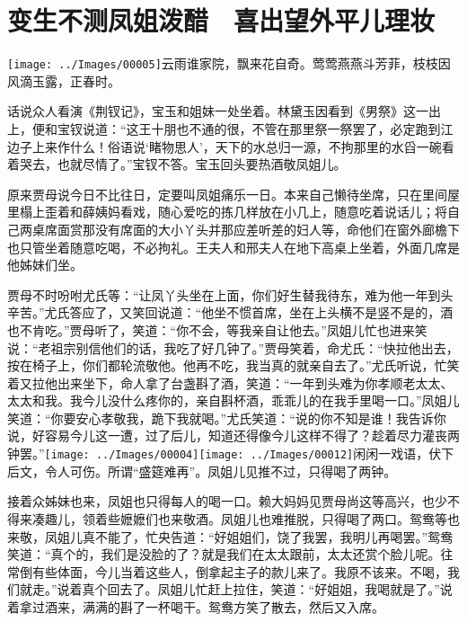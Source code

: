 

\chapter{变生不测凤姐泼醋　喜出望外平儿理妆}\label{part0048_split_000.htmlux5cux23calibre_pb_0}

{\texttt{[image: ../Images/00005]}云雨谁家院，飘来花自奇。莺莺燕燕斗芳菲，枝枝因风滴玉露，正春时。}

话说众人看演《荆钗记》，宝玉和姐妹一处坐着。林黛玉因看到《男祭》这一出上，便和宝钗说道：``这王十朋也不通的很，不管在那里祭一祭罢了，必定跑到江边子上来作什么！俗语说`睹物思人'，天下的水总归一源，不拘那里的水舀一碗看着哭去，也就尽情了。''宝钗不答。宝玉回头要热酒敬凤姐儿。

原来贾母说今日不比往日，定要叫凤姐痛乐一日。本来自己懒待坐席，只在里间屋里榻上歪着和薛姨妈看戏，随心爱吃的拣几样放在小几上，随意吃着说话儿；将自己两桌席面赏那没有席面的大小丫头并那应差听差的妇人等，命他们在窗外廊檐下也只管坐着随意吃喝，不必拘礼。王夫人和邢夫人在地下高桌上坐着，外面几席是他姊妹们坐。

贾母不时吩咐尤氏等：``让凤丫头坐在上面，你们好生替我待东，难为他一年到头辛苦。''尤氏答应了，又笑回说道：``他坐不惯首席，坐在上头横不是竖不是的，酒也不肯吃。''贾母听了，笑道：``你不会，等我亲自让他去。''凤姐儿忙也进来笑说：``老祖宗别信他们的话，我吃了好几钟了。''贾母笑着，命尤氏：``快拉他出去，按在椅子上，你们都轮流敬他。他再不吃，我当真的就亲自去了。''尤氏听说，忙笑着又拉他出来坐下，命人拿了台盏斟了酒，笑道：``一年到头难为你孝顺老太太、太太和我。我今儿没什么疼你的，亲自斟杯酒，乖乖儿的在我手里喝一口。''凤姐儿笑道：``你要安心孝敬我，跪下我就喝。''尤氏笑道：``说的你不知是谁！我告诉你说，好容易今儿这一遭，过了后儿，知道还得像今儿这样不得了？趁着尽力灌丧两钟罢。''{\texttt{[image: ../Images/00004]}\texttt{[image: ../Images/00012]}\footnotesize \kaishu 闲闲一戏语，伏下后文，令人可伤。所谓``盛筵难再''。}凤姐儿见推不过，只得喝了两钟。

接着众姊妹也来，凤姐也只得每人的喝一口。赖大妈妈见贾母尚这等高兴，也少不得来凑趣儿，领着些嬷嬷们也来敬酒。凤姐儿也难推脱，只得喝了两口。鸳鸯等也来敬，凤姐儿真不能了，忙央告道：``好姐姐们，饶了我罢，我明儿再喝罢。''鸳鸯笑道：``真个的，我们是没脸的了？就是我们在太太跟前，太太还赏个脸儿呢。往常倒有些体面，今儿当着这些人，倒拿起主子的款儿来了。我原不该来。不喝，我们就走。''说着真个回去了。凤姐儿忙赶上拉住，笑道：``好姐姐，我喝就是了。''说着拿过酒来，满满的斟了一杯喝干。鸳鸯方笑了散去，然后又入席。

